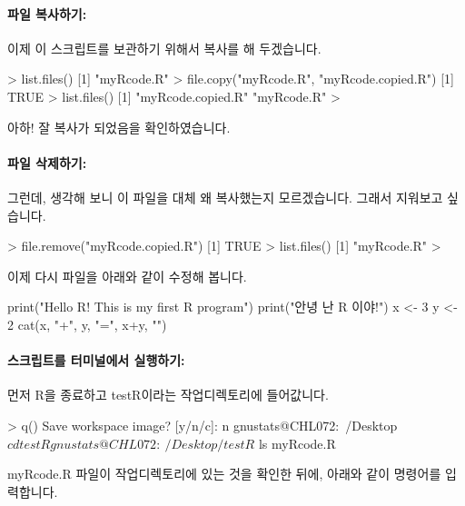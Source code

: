 \documentclass[tutorial.tex]{subfiles}
\begin{document}
\paragraph{파일 복사하기:}
이제 이 스크립트를 보관하기 위해서 복사를 해 두겠습니다.

\begin{Schunk}
\begin{Soutput}
> list.files()
[1] "myRcode.R"
> file.copy("myRcode.R", "myRcode.copied.R")
[1] TRUE
> list.files()
[1] "myRcode.copied.R" "myRcode.R"       
> 
\end{Soutput}
\end{Schunk}

아하! 잘 복사가 되었음을 확인하였습니다.

\paragraph{파일 삭제하기:}
그런데, 생각해 보니 이 파일을 대체 왜 복사했는지 모르겠습니다. 
그래서 지워보고 싶습니다. 

\begin{Schunk}
\begin{Soutput}
> file.remove("myRcode.copied.R")
[1] TRUE
> list.files()
[1] "myRcode.R"
> 
\end{Soutput}
\end{Schunk}

이제 다시 파일을 아래와 같이 수정해 봅니다. 
\begin{Schunk}
\begin{Soutput}
print("Hello R!  This is my first R program")
print("안녕 난 R 이야!")
x <- 3
y <- 2
cat(x, "+", y, "=", x+y, "\n")
\end{Soutput}
\end{Schunk}

\paragraph{스크립트를 터미널에서 실행하기: }

먼저 R을 종료하고 testR이라는 작업디렉토리에 들어값니다.  
\begin{Schunk}
\begin{Soutput}
> q()
Save workspace image? [y/n/c]: n
gnustats@CHL072:~/Desktop$ cd testR
gnustats@CHL072:~/Desktop/testR$ ls
myRcode.R
\end{Soutput}
\end{Schunk}

myRcode.R 파일이 작업디렉토리에 있는 것을 확인한 뒤에, 아래와 같이 명령어를 입력합니다. 
\end{document}
